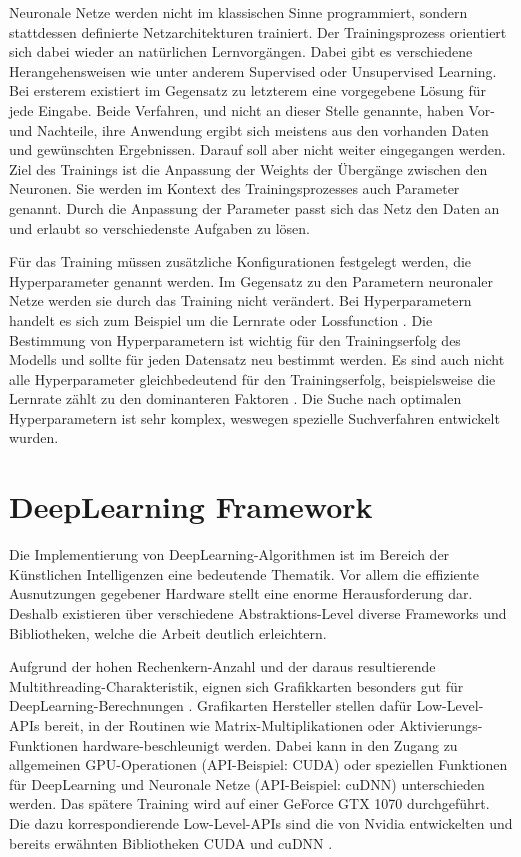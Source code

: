 Neuronale Netze werden nicht im klassischen Sinne programmiert, sondern stattdessen definierte Netzarchitekturen trainiert.
Der Trainingsprozess orientiert sich dabei wieder an natürlichen Lernvorgängen.
Dabei gibt es verschiedene Herangehensweisen wie unter anderem Supervised oder Unsupervised Learning.
Bei ersterem existiert im Gegensatz zu letzterem eine vorgegebene Lösung für jede Eingabe.
Beide Verfahren, und nicht an dieser Stelle genannte, haben Vor- und Nachteile, ihre Anwendung ergibt sich meistens aus den vorhanden Daten und gewünschten Ergebnissen.
Darauf soll aber nicht weiter eingegangen werden.
Ziel des Trainings ist die Anpassung der Weights der Übergänge zwischen den Neuronen.
Sie werden im Kontext des Trainingsprozesses auch Parameter genannt.
Durch die Anpassung der Parameter passt sich das Netz den Daten an und erlaubt so verschiedenste Aufgaben zu lösen.
\newline

Für das Training müssen zusätzliche Konfigurationen festgelegt werden, die Hyperparameter genannt werden.
Im Gegensatz zu den Parametern neuronaler Netze werden sie durch das Training nicht verändert.
Bei Hyperparametern handelt es sich zum Beispiel um die Lernrate oder Lossfunction \cite{hyperparameters-gan-using-genetic-algorithm}.
Die Bestimmung von Hyperparametern ist wichtig für den Trainingserfolg des Modells und sollte für jeden Datensatz neu bestimmt werden.
Es sind auch nicht alle Hyperparameter gleichbedeutend für den Trainingserfolg, beispielsweise die Lernrate zählt zu den dominanteren Faktoren \cite{learning-rate-most-important}.
Die Suche nach optimalen Hyperparametern ist sehr komplex, weswegen spezielle Suchverfahren entwickelt wurden. 

\section{DeepLearning Framework}
Die Implementierung von DeepLearning-Algorithmen ist im Bereich der Künstlichen Intelligenzen eine bedeutende Thematik.
Vor allem die effiziente Ausnutzungen gegebener Hardware stellt eine enorme Herausforderung dar. 
Deshalb existieren über verschiedene Abstraktions-Level diverse Frameworks und Bibliotheken, welche die Arbeit deutlich erleichtern.
\newline

Aufgrund der hohen Rechenkern-Anzahl und der daraus resultierende Multithreading-Charakteristik, eignen sich Grafikkarten besonders gut für DeepLearning-Berechnungen \cite{gpu-for-dl}.
Grafikarten Hersteller stellen dafür Low-Level-APIs bereit, in der Routinen wie Matrix-Multiplikationen oder Aktivierungs-Funktionen hardware-beschleunigt werden.
Dabei kann in den Zugang zu allgemeinen GPU-Operationen (API-Beispiel: CUDA) oder speziellen Funktionen für DeepLearning und Neuronale Netze (API-Beispiel: cuDNN) unterschieden werden.
Das spätere Training wird auf einer GeForce GTX 1070 \cite{gtx-1070} durchgeführt.
Die dazu korrespondierende Low-Level-APIs sind die von Nvidia entwickelten und bereits erwähnten Bibliotheken CUDA \cite{cuda-doc} und cuDNN \cite{cudnn-doc}.  
\newline

